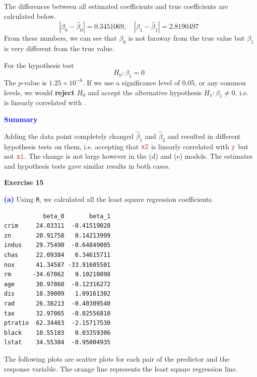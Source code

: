 \documentclass[a4paper,12pt]{article}
\newcommand{\code}[1]{\texttt{#1}}
\newcommand{\qnum}[1]{\noindent\textcolor{blue}{\textbf{(#1)}}}
\begin{document}
The differences between all estimated coefficients and true coefficients are calculated below.
\[
    |\beta_0 - \hat\beta_0| = 0.3451069,\quad 
    |\beta_1 - \hat\beta_1| = 2.8190497
\]
From these numbers, we can see that $\beta_0$ is not faraway from the true value but $\beta_1$ is very different from the true value.
\bigskip

For the hypothesis test
\[
    H_0: \beta_1 = 0
\]
The $p$-value is $1.25\times 10^{-6}$. If we use a significance level of 0.05, or any common levels, we would \textbf{reject} $H_0$ and accept the alternative hypothesis $H_1: \beta_1 \ne 0$, i.e. \yr is linearly correlated with \xbr.
\bigskip\bigskip


\noindent\textcolor{blue}{\textbf{Summary}}\bigskip

Adding the data point completely changed $\hat\beta_1$ and $\hat\beta_2$ and resulted in different hypothesis tests on them, i.e. accepting that $\xbr$ is linearly correlated with $\yr$ but not $\xar$.
The change is not large however in the (d) and (e) models. The estimates and hypothesis tests gave similar results in both cases.
\bigskip\bigskip






\begin{center}
    \textcolor{myfirebrick}{\textbf{Exercise 15}}
\end{center}

\qnum{a}
Using \code{R}, we calculated all the least square regression coefficients.

\begin{verbatim}
           beta_0       beta_1
crim     24.03311  -0.41519028
zn       20.91758   0.14213999
indus    29.75490  -0.64849005
chas     22.09384   6.34615711
nox      41.34587 -33.91605501
rm      -34.67062   9.10210898
age      30.97868  -0.12316272
dis      18.39009   1.09161302
rad      26.38213  -0.40309540
tax      32.97065  -0.02556810
ptratio  62.34463  -2.15717530
black    10.55103   0.03359306
lstat    34.55384  -0.95004935
\end{verbatim}

The following plots are scatter plots for each pair of the predictor and the response variable. The orange line represents the least square regression line.
\end{document}

